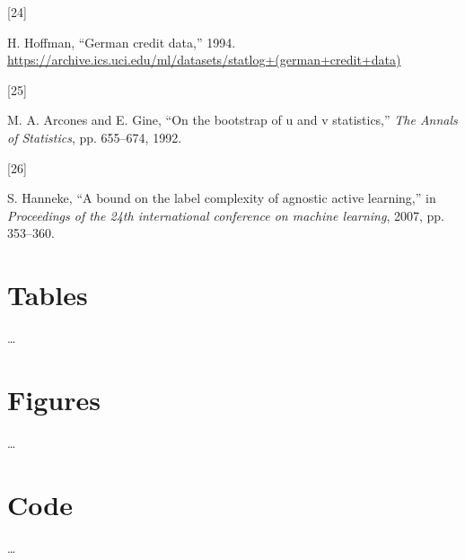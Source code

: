 \documentclass[
  conference]{IEEEtran}
\newlength{\cslhangindent}
\newlength{\csllabelwidth}
\newlength{\cslentryspacingunit} %
\newenvironment{CSLReferences}[2] %
 {%
  \setlength{\parindent}{0pt}
  \ifodd #1
  \let\oldpar\par
  \def\par{\hangindent=\cslhangindent\oldpar}
  \fi
  \setlength{\parskip}{#2\cslentryspacingunit}
 }%
 {}
\newcommand{\CSLLeftMargin}[1]{\parbox[t]{\csllabelwidth}{#1}}
\newcommand{\CSLRightInline}[1]{\parbox[t]{\linewidth - \csllabelwidth}{#1}\break}
\begin{document}
\begin{CSLReferences}{0}{0}
\leavevmode{}%
\CSLLeftMargin{{[}24{]} }%
\CSLRightInline{H. Hoffman, {``German credit data,''} 1994.
\url{https://archive.ics.uci.edu/ml/datasets/statlog+(german+credit+data)}}

\leavevmode{}%
\CSLLeftMargin{{[}25{]} }%
\CSLRightInline{M. A. Arcones and E. Gine, {``On the bootstrap of u and
v statistics,''} \emph{The Annals of Statistics}, pp. 655--674, 1992.}

\leavevmode{}%
\CSLLeftMargin{{[}26{]} }%
\CSLRightInline{S. Hanneke, {``A bound on the label complexity of
agnostic active learning,''} in \emph{Proceedings of the 24th
international conference on machine learning}, 2007, pp. 353--360.}

\end{CSLReferences}

\pagebreak

\hypertarget{tables}{%
\section{Tables}\label{tables}}

\ldots{}

\pagebreak

\hypertarget{figures}{%
\section{Figures}\label{figures}}

\ldots{}

\pagebreak

\hypertarget{code}{%
\section{Code}\label{code}}

\ldots{}
\end{document}
